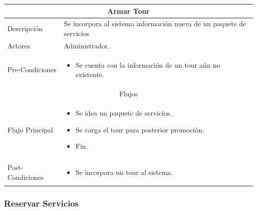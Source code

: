 \documentclass[12pt,a4paper]{article}
\newenvironment{myitemize}
{\begin{itemize}[leftmargin=*,noitemsep,topsep=0pt]}{\end{itemize}}
\newenvironment{caseuse}
{\begin{center}\begin{tabular}{|l|p{10cm}|}}{\end{tabular}\end{center}}
\begin{document}
			\begin{caseuse}
				\hline
				\multicolumn{2}{|c|}{Armar Tour} \\ \hline

				Descripción &  Se incorpora al sistema información nueva de un paquete de servicios\\ \hline

				Actores & Administrador. \\ \hline

				Pre-Condiciones & 
					\begin{myitemize}
						\item Se cuenta con la información de un tour aún no existente.
					\end{myitemize} \\ \hline

				\multicolumn{2}{|c|}{Flujos} \\ \hline

				Flujo Principal &
					\begin{myitemize}
						\item Se idea un paquete de servicios.
						\item Se carga el tour para posterior promoción.
						\item Fin.
					\end{myitemize} \\ \hline

				Post-Condiciones &
					\begin{myitemize}
						\item Se incorpora un tour al sistema.
					\end{myitemize}\\ \hline
			\end{caseuse}

	\subsubsection{Reservar Servicios}
\end{document}

